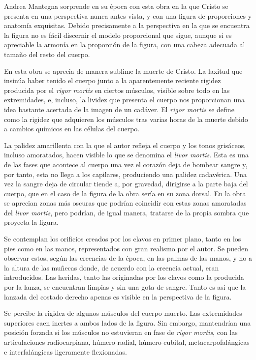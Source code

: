 Andrea Mantegna sorprende en su época con esta obra en la que Cristo se presenta en una perspectiva nunca antes vista, y con una figura de proporciones y anatomía exquisitas. Debido precisamente a la perspectiva en la que se encuentra la figura no es fácil discernir el modelo proporcional que sigue, aunque si es apreciable la armonía en la proporción de la figura, con una cabeza adecuada al tamaño del resto del cuerpo.

En esta obra se aprecia de manera sublime la muerte de Cristo. La laxitud que insinúa haber tenido el cuerpo junto a la aparentemente reciente rigidez producida por el \textit{rigor mortis} en ciertos músculos, visible sobre todo en las extremidades, e, incluso, la lividez que presenta el cuerpo nos proporcionan una idea bastante acertada de la imagen de un cadáver. El \textit{rigor mortis} se define como la rigidez que adquieren los músculos tras varias horas de la muerte debido a cambios químicos en las células del cuerpo.

La palidez amarillenta con la que el autor refleja el cuerpo y los tonos grisáceos, incluso amoratados, hacen visible lo que se denomina el \textit{livor mortis}. Esta es una de las fases que acontece al cuerpo una vez el corazón deja de bombear sangre y, por tanto, esta no llega a los capilares, produciendo una palidez cadavérica. Una vez la sangre deja de circular tiende a, por gravedad, dirigirse a la parte baja del cuerpo, que en el caso de la figura de la obra sería en su zona dorsal. En la obra se aprecian zonas más oscuras que podrían coincidir con estas zonas amoratadas del \textit{livor mortis}, pero podrían, de igual manera, tratarse de la propia sombra que proyecta la figura.

Se contemplan los orificios creados por los clavos en primer plano, tanto en los pies como en las manos, representados con gran realismo por el autor. Se pueden observar estos, según las creencias de la época, en las palmas de las manos, y no a la altura de las muñecas donde, de acuerdo con la creencia actual, eran introducidos.
Las heridas, tanto las originadas por los clavos como la producida por la lanza, se encuentran limpias y sin una gota de sangre. Tanto es así que la lanzada del costado derecho apenas es visible en la perspectiva de la figura. 

Se percibe la rigidez de algunos músculos del cuerpo muerto. Las extremidades superiores caen inertes a ambos lados de la figura. Sin embargo, mantendrían una posición forzada si los músculos no estuvieran en fase de \textit{rigor mortis}, con las articulaciones radiocarpiana, húmero-radial, húmero-cubital, metacarpofalángicas e interfalángicas  ligeramente flexionadas.

